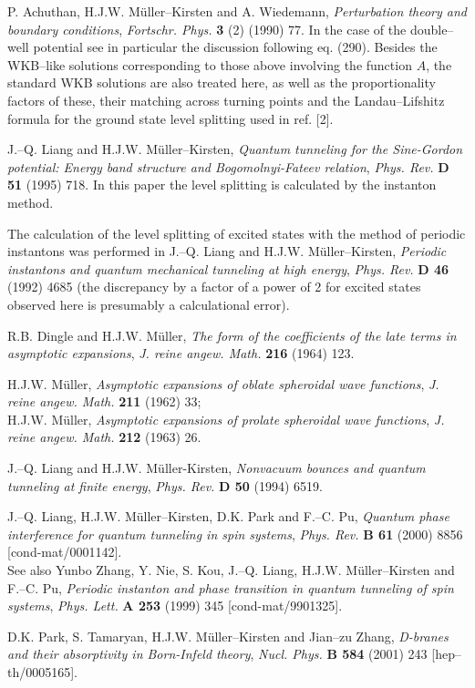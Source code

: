 \documentclass[a4paper,12pt,a4]{article}
\begin{document}
\begin{thebibliography}{99}
  P. Achuthan, H.J.W. M\"{u}ller--Kirsten and A. Wiedemann, {\it %
Perturbation theory and boundary conditions}, {\it Fortschr. Phys.} {\bf 3}
(2) (1990) 77. In the case of the double--well potential see in particular
the discussion following eq. (290). Besides the WKB--like solutions
corresponding to those above involving the function $A$, the standard WKB
solutions are also treated here, as well as the proportionality factors of
these, their matching across turning points and the Landau--Lifshitz formula
for the ground state level splitting used in ref. [2].

  J.--Q. Liang and H.J.W. M\"{u}ller--Kirsten, {\it Quantum
tunneling for the Sine-Gordon potential: Energy band structure and
Bogomolnyi-Fateev relation}, {\it Phys. Rev.} {\bf D 51} (1995) 718. In this
paper the level splitting is calculated by the instanton method.

  The calculation of the level splitting of excited states with
the method of periodic instantons was performed in J.--Q. Liang and H.J.W.
M\"{u}ller--Kirsten, {\it Periodic instantons and quantum mechanical
tunneling at high energy}, {\it Phys. Rev.} {\bf D 46} (1992) 4685 (the
discrepancy by a factor of a power of 2 for excited states observed here is
presumably a calculational error).

  R.B. Dingle and H.J.W. M\"{u}ller, {\it The form of the
coefficients of the late terms in asymptotic expansions}, {\it J. reine
angew. Math.} {\bf 216} (1964) 123.

  H.J.W. M\"{u}ller, {\it Asymptotic expansions of oblate
spheroidal wave functions}, {\it J. reine angew. Math.} {\bf 211} (1962) 33;\\
H.J.W. M\"{u}ller, {\it Asymptotic expansions of prolate spheroidal wave
functions}, {\it J. reine angew. Math.} {\bf 212} (1963) 26.

  J.--Q. Liang and H.J.W. M\"{u}ller-Kirsten, {\it Nonvacuum
bounces and quantum tunneling at finite energy}, {\it Phys. Rev.} {\bf D 50}
(1994) 6519.

  J.--Q. Liang, H.J.W. M\"{u}ller--Kirsten, D.K. Park and F.--C.
Pu, {\it Quantum phase interference for quantum tunneling in spin systems}, 
{\it Phys. Rev.} {\bf B 61} (2000) 8856 [cond-mat/0001142].\\ See also Yunbo Zhang, Y. Nie, S.
Kou, J.--Q. Liang, H.J.W. M\"{u}ller--Kirsten and F.--C. Pu, {\it Periodic
instanton and phase transition in quantum tunneling of spin systems}, {\it %
Phys. Lett.} {\bf A 253} (1999) 345 [cond-mat/9901325].

  D.K. Park, S. Tamaryan, H.J.W. M\"{u}ller--Kirsten and Jian--zu
Zhang, {\it D-branes and their absorptivity in Born-Infeld theory}, {\it %
Nucl. Phys.} {\bf B 584} (2001) 243 [hep--th/0005165].\bigskip 




\end{thebibliography}
\end{document}
